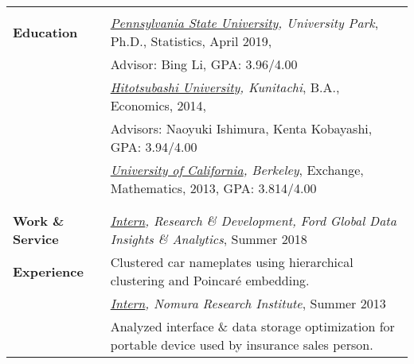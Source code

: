 \documentclass[utf8,letterpaper,oneside]{article}
\begin{document}
\begin{center}
 \begin{tabular}{l l}
  \hline
                           &                                                                                                                                                  \\
  \textbf{Education}       & \textit{\underline{Pennsylvania State University}, University Park}, {Ph.D., Statistics}, April 2019,                                     \\
                           & Advisor: Bing Li, GPA: 3.96/4.00                                                                                                                 \\
                           & \textit{\underline{Hitotsubashi University}, Kunitachi}, B.A., Economics, 2014,                                                                  \\
                           & Advisors: Naoyuki Ishimura, Kenta Kobayashi, GPA: 3.94/4.00                                                                                      \\
                           & \textit{\underline{University of California}, Berkeley}, Exchange, Mathematics, 2013, GPA: 3.814/4.00                                            \\
                           &                                                                                                                                                  \\ \hline
                           &                                                                                                                                                  \\
  \textbf{Work \& Service} & \textit{\underline{{Intern}}, Research \& Development, Ford Global Data Insights \& Analytics}, Summer 2018                                      \\
  \textbf{Experience}      & Clustered car nameplates using hierarchical clustering and Poincar\'e embedding.                                                                 \\
                           & \textit{\underline{{Intern}}, Nomura Research Institute}, Summer 2013                                                                            \\
                           & Analyzed interface \& data storage optimization for portable device used by insurance sales person.                                              \\

\end{tabular}
\end{center}
\end{document}
